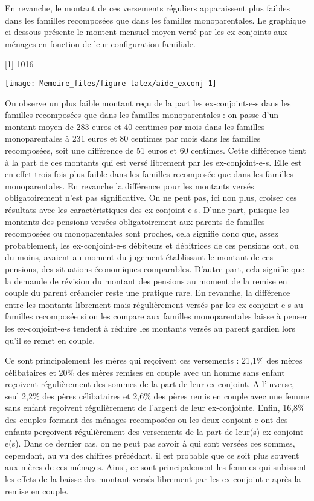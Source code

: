\documentclass[
  12pt,
]{book}
\begin{document}
En revanche, le montant de ces versements réguliers apparaissent plus
faibles dans les familles recomposées que dans les familles
monoparentales. Le graphique ci-dessous présente le montent mensuel
moyen versé par les ex-conjoints aux ménages en fonction de leur
configuration familiale.

{[}1{]} 1016

\begin{center}\texttt{[image: Memoire\_files/figure-latex/aide\_exconj-1]} \end{center}

On observe un plus faible montant reçu de la part les ex-conjoint-e-s
dans les familles recomposées que dans les familles monoparentales : on
passe d'un montant moyen de 283 euros et 40 centimes par mois dans les
familles monoparentales à 231 euros et 80 centimes par mois dans les
familles recomposées, soit une différence de 51 euros et 60 centimes.
Cette différence tient à la part de ces montants qui est versé librement
par les ex-conjoint-e-s. Elle est en effet trois fois plus faible dans
les familles recomposée que dans les familles monoparentales. En
revanche la différence pour les montants versés obligatoirement n'est
pas significative. On ne peut pas, ici non plus, croiser ces résultats
avec les caractéristiques des ex-conjoint-e-s. D'une part, puisque les
montants des pensions versées obligatoirement aux parents de familles
recomposées ou monoparentales sont proches, cela signifie donc que,
assez probablement, les ex-conjoint-e-s débiteurs et débitrices de ces
pensions ont, ou du moins, avaient au moment du jugement établissant le
montant de ces pensions, des situations économiques comparables. D'autre
part, cela signifie que la demande de révision du montant des pensions
au moment de la remise en couple du parent créancier reste une pratique
rare. En revanche, la différence entre les montants librement mais
régulièrement versés par les ex-conjoint-e-s au familles recomposée si
on les compare aux familles monoparentales laisse à penser les
ex-conjoint-e-s tendent à réduire les montants versés au parent gardien
lors qu'il se remet en couple.

Ce sont principalement les mères qui reçoivent ces versements : 21,1\%
des mères célibataires et 20\% des mères remises en couple avec un homme
sans enfant reçoivent régulièrement des sommes de la part de leur
ex-conjoint. A l'inverse, seul 2,2\% des pères célibataires et 2,6\% des
pères remis en couple avec une femme sans enfant reçoivent régulièrement
de l'argent de leur ex-conjointe. Enfin, 16,8\% des couples formant des
ménages recomposées ou les deux conjoint-e ont des enfants perçoivent
régulièrement des versements de la part de leur(s) ex-conjoint-e(s).
Dans ce dernier cas, on ne peut pas savoir à qui sont versées ces
sommes, cependant, au vu des chiffres précédant, il est probable que ce
soit plus souvent aux mères de ces ménages. Ainsi, ce sont
principalement les femmes qui subissent les effets de la baisse des
montant versés librement par les ex-conjoint-e après la remise en
couple.
\end{document}

